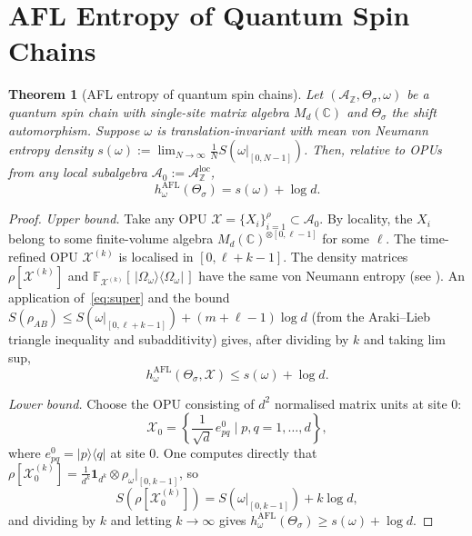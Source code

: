 \documentclass[12pt,a4paper]{article}
\newtheorem{theorem}{Theorem}[section]
\newcommand{\A}{\mathcal{A}}
\begin{document}
\section{AFL Entropy of Quantum Spin Chains}
\label{sec:spinchain}

\begin{theorem}[AFL entropy of quantum spin chains]
\label{thm:spinchain}
Let $(\A_\mathbb{Z},\Theta_\sigma,\omega)$ be a quantum spin chain with
single-site matrix algebra $M_d(\mathbb{C})$ and $\Theta_\sigma$ the shift
automorphism.  Suppose $\omega$ is translation-invariant with mean von Neumann
entropy density $s(\omega):=\lim_{N\to\infty}\frac{1}{N}S(\omega|_{[0,N-1]})$.
Then, relative to OPUs from any local subalgebra $\A_0:=\A_\mathbb{Z}^{\mathrm{loc}}$,
\begin{equation}\label{eq:spinchain_AFL}
  h_\omega^{\mathrm{AFL}}(\Theta_\sigma) = s(\omega) + \log d.
\end{equation}
\end{theorem}

\begin{proof}
\textit{Upper bound.} Take any OPU $\mathcal{X}=\{X_i\}_{i=1}^\rho\subset
\A_0$.  By locality, the $X_i$ belong to some finite-volume algebra
$M_d(\mathbb{C})^{\otimes[0,\ell-1]}$ for some $\ell$.  The time-refined OPU
$\mathcal{X}^{(k)}$ is localised in $[0,\ell+k-1]$.  The density matrices
$\rho[\mathcal{X}^{(k)}]$ and $\mathbb{F}_{\mathcal{X}^{(k)}}[\,|\Omega_\omega\rangle\langle\Omega_\omega|\,]$
have the same von Neumann entropy (see \cite[Eq.~(8.67)]{benatti2023}).
An application of~\eqref{eq:super} and the bound $S(\rho_{AB})\leq
S(\omega|_{[0,\ell+k-1]}) + (m+\ell-1)\log d$ (from the Araki--Lieb
triangle inequality and subadditivity) gives, after dividing by $k$ and
taking lim sup,
\[
  h_\omega^{\mathrm{AFL}}(\Theta_\sigma,\mathcal{X})
  \leq s(\omega) + \log d.
\]

\textit{Lower bound.} Choose the OPU consisting of $d^2$ normalised matrix
units at site $0$:
\[
  \mathcal{X}_0 = \left\{\frac{1}{\sqrt{d}}\,e_{pq}^0 \;\Big|\; p,q=1,\ldots,d\right\},
\]
where $e_{pq}^0=|p\rangle\langle q|$ at site $0$.  One computes directly
that $\rho[\mathcal{X}_0^{(k)}] = \frac{1}{d^k}\mathbf{1}_{d^k}\otimes
\rho_\omega|_{[0,k-1]}$, so
\[
  S\!\left(\rho[\mathcal{X}_0^{(k)}]\right)
  = S(\omega|_{[0,k-1]}) + k\log d,
\]
and dividing by $k$ and letting $k\to\infty$ gives
$h_\omega^{\mathrm{AFL}}(\Theta_\sigma)\geq s(\omega)+\log d$.
\end{proof}
\end{document}
